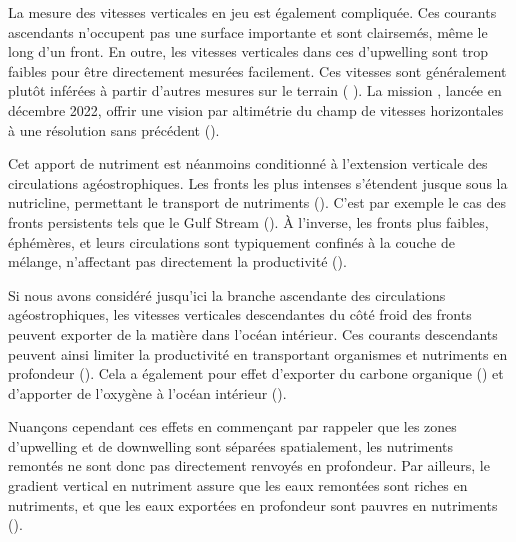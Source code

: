 La mesure des vitesses verticales en jeu est également compliquée.
Ces courants ascendants n'occupent pas une surface importante et sont clairsemés, même le long d'un front.
En outre, les vitesses verticales dans ces  d'upwelling sont  trop faibles pour être directement mesurées facilement.
Ces vitesses sont généralement plutôt inférées à partir d'autres mesures sur le terrain ( \cite{dasaro_2018,tarry_2021,comby_2022,cutolo_2022}).
La mission , lancée en décembre 2022, offrir une vision par altimétrie du champ de vitesses horizontales à une résolution sans précédent (\cite{dovidio_2019}).

Cet apport de nutriment est néanmoins conditionné à l'extension verticale des circulations agéostrophiques.
Les fronts les plus intenses s'étendent jusque sous la nutricline, permettant le transport de nutriments (\cite{levy_2001,thomas_2013,pasquerondefommervault_2015,capet_2016}).
C'est par exemple le cas des fronts persistents tels que le Gulf Stream (\cite{levy_2012a}).
À l'inverse, les fronts plus faibles, éphémères, et leurs circulations sont typiquement confinés à la couche de mélange, n'affectant pas directement la productivité (\cite{ramachandran_2014,levy_2018}).

Si nous avons considéré jusqu'ici la branche ascendante des circulations agéostrophiques, les vitesses verticales descendantes du côté froid des fronts peuvent exporter de la matière dans l'océan intérieur.
Ces courants descendants peuvent ainsi limiter la productivité en transportant organismes et nutriments en profondeur (\cite{mcgillicuddy_2003,lathuiliere_2010,gruber_2011,levy_2012a,resplandy_2019}).
Cela a également pour effet d'exporter du carbone organique (\cite{levy_2001,omand_2015}) et d'apporter de l'oxygène à l'océan intérieur (\cite{resplandy_2012}).

Nuançons cependant ces effets en commençant par rappeler que les zones d'upwelling et de downwelling sont séparées spatialement, les nutriments remontés ne sont donc pas directement renvoyés en profondeur.
Par ailleurs, le gradient vertical en nutriment  assure que les eaux remontées sont riches en nutriments, et que les eaux exportées en profondeur sont pauvres en nutriments (\cite{mahadevan_2016}).


